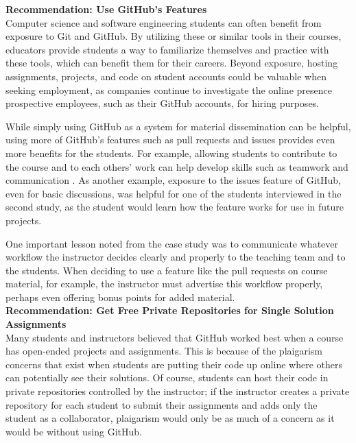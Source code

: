 \textbf{Recommendation: Use GitHub's Features} \\
Computer science and software engineering students can often benefit from exposure to Git and GitHub. By utilizing these or similar tools in their courses, educators provide students a way to familiarize themselves and practice with these tools, which can benefit them for their careers. Beyond exposure, hosting assignments, projects, and code on student accounts could be valuable when seeking employment, as companies continue to investigate the online presence prospective employees, such as their GitHub accounts, for hiring purposes.

While simply using GitHub as a system for material dissemination can be helpful, using more of GitHub's features such as pull requests and issues provides even more benefits for the students. For example, allowing students to contribute to the course and to each others' work can help develop skills such as teamwork and communication \cite{hamer2006some}. As another example, exposure to the issues feature of GitHub, even for basic discussions, was helpful for one of the students interviewed in the second study, as the student would learn how the feature works for use in future projects.

One important lesson noted from the case study was to communicate whatever workflow the instructor decides clearly and properly to the teaching team and to the students. When deciding to use a feature like the pull requests on course material, for example, the instructor must advertise this workflow properly, perhaps even offering bonus points for added material. \\


\textbf{Recommendation: Get Free Private Repositories for Single Solution Assignments} \\
Many students and instructors believed that GitHub worked best when a course has open-ended projects and assignments. This is because of the plaigarism concerns that exist when students are putting their code up online where others can potentially see their solutions. Of course, students can host their code in private repositories controlled by the instructor; if the instructor creates a private repository for each student to submit their assignments and adds only the student as a collaborator, plaigarism would only be as much of a concern as it would be without using GitHub.

